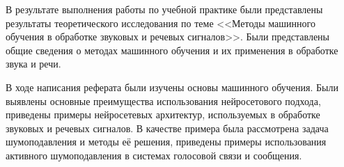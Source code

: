 
В результате выполнения работы по учебной практике были представлены результаты
теоретического исследования по теме <<Методы машинного обучения
в обработке звуковых и речевых сигналов>>. Были представлены общие
сведения о методах машинного обучения и их применения в обработке
звука и речи. 

В ходе написания реферата были изучены основы машинного обучения.
Были выявлены основные преимущества использования нейросетового подхода,
приведены примеры нейросетевых архитектур, используемых
в обработке звуковых и речевых сигналов.
В качестве примера была рассмотрена задача шумоподавления
и методы её решения, приведены примеры использования
активного шумоподавления в системах голосовой связи и сообщения.